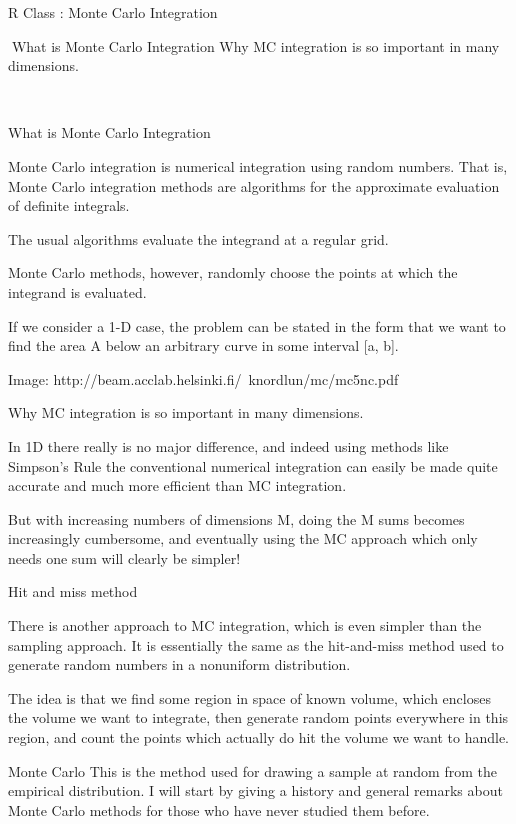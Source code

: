 R Class : Monte Carlo Integration

What is Monte Carlo Integration
Why MC integration is so important in many dimensions.




What is Monte Carlo Integration

Monte Carlo integration is numerical integration using random numbers. That is, Monte Carlo integration methods are algorithms for the approximate evaluation of definite integrals.

The usual algorithms evaluate the integrand at a regular grid. 

Monte Carlo methods, however, randomly choose the points at which the integrand is evaluated.

If we consider a 1-D case, the problem can be stated in the form that we want to find the
area A below an arbitrary curve in some interval [a, b].

Image: http://beam.acclab.helsinki.fi/~knordlun/mc/mc5nc.pdf




Why MC integration is so important in many dimensions.

In 1D there really is no major difference, and indeed using methods like Simpson’s Rule the
conventional numerical integration can easily be made quite accurate and much more
efficient than MC integration.

But with increasing numbers of dimensions M, doing the M sums becomes increasingly cumbersome, and eventually using the MC approach which only needs one sum will clearly be simpler!




Hit and miss method

There is another approach to MC integration, which is even simpler than the sampling approach.
It is essentially the same as the hit-and-miss method used to generate random numbers in a
nonuniform distribution. 

The idea is that we find some region in space of known volume, which encloses the volume we want to integrate, then generate random points everywhere in this region, and count the points which actually do hit the volume we want to handle.




Monte Carlo
This is the method used for drawing a sample at random from the empirical distribution. I will start by giving a history and general remarks about Monte Carlo methods for those who have never studied them before.

